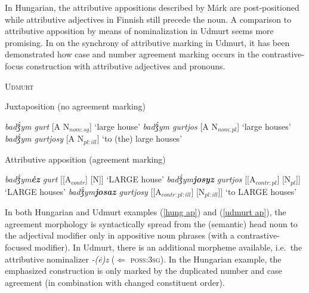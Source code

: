 {In Hungarian, the attributive appositions described by Márk are post-positioned while attributive adjectives in Finnish still precede the noun. A comparison to attributive apposition by means of nominalization in Udmurt seems more promising. In  on the synchrony of attributive marking in Udmurt, it has been demonstrated how case and number agreement marking occurs in the contrastive-focus construction with attributive adjectives and pronouns.
\begin{exe}
\ex \textsc{Udmurt} \citep{winkler2001} \label{udmurt ap}
\begin{xlist}
\ex 	Juxtaposition (no agreement marking)
\begin{xlist}
\ex	\textit{badǯ́ym gurt} [A N$_{nom:sg}$] ‘large house’
\ex	\textit{badǯ́ym gurtjos} [A N$_{nom:pl}$] ‘large houses’
\ex	\textit{badǯ́ym gurtjosy} [A N$_{pl:ill}$] ‘to (the) large houses’
\end{xlist}
\ex	Attributive apposition (agreement marking)
\begin{xlist}
\ex	\textit{badǯ́ym\textbf{ėz} gurt} [[A$_{contr}$] [N]] ‘LARGE house’
\ex	\textit{badǯ́ym\textbf{josyz} gurtjos} [[A$_{contr:pl}$] [N$_{pl}$]] ‘LARGE houses’
\ex	\textit{badǯ́ym\textbf{josaz} gurtjosy} [[A$_{contr:pl:ill}$] [N$_{pl:ill}$]] ‘to LARGE houses’
\end{xlist}
\end{xlist}
\end{exe}
In both Hungarian and Udmurt examples (\ref{hung ap}) and (\ref{udmurt ap}), the agreement morphology is syntactically spread from the (semantic) head noun to the adjectival modifier only in appositive noun phrases (with a contrastive-focused modifier). In Udmurt, there is an additional morpheme available, i.e.~the attributive nominalizer \textit{-(ė)z} ($\Leftarrow$ \textsc{poss:3sg}). In the Hungarian example, the emphasized construction is only marked by the duplicated number and case agreement (in combination with changed constituent order).

}
